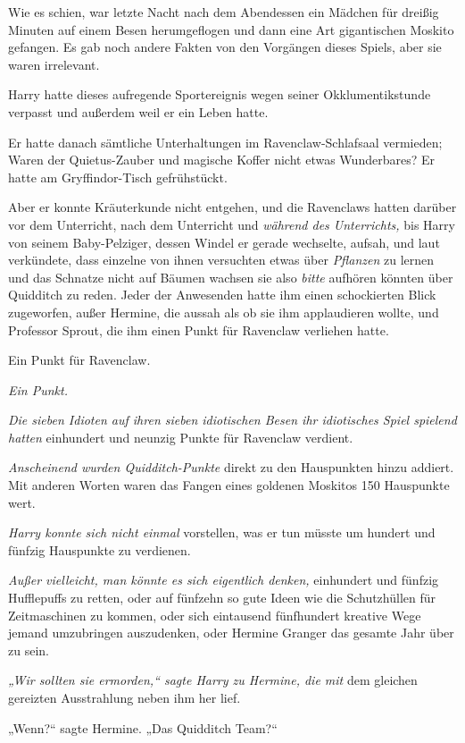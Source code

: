 {Wie es schien, war letzte Nacht nach dem Abendessen ein Mädchen für dreißig Minuten auf einem Besen herumgeflogen und dann eine Art gigantischen Moskito gefangen. Es gab noch andere Fakten von den Vorgängen dieses Spiels, aber sie waren irrelevant.

Harry hatte dieses aufregende Sportereignis wegen seiner Okklumentikstunde verpasst und außerdem weil er ein Leben hatte.

Er hatte danach sämtliche Unterhaltungen im Ravenclaw-Schlafsaal vermieden; Waren der Quietus-Zauber und magische Koffer nicht etwas Wunderbares? Er hatte am Gryffindor-Tisch gefrühstückt.

Aber er konnte Kräuterkunde nicht entgehen, und die Ravenclaws hatten darüber vor dem Unterricht, nach dem Unterricht und \emph{während des Unterrichts,} bis Harry von seinem Baby-Pelziger, dessen Windel er gerade wechselte, aufsah, und laut verkündete, dass einzelne von ihnen versuchten etwas über \emph{Pflanzen} zu lernen und das Schnatze nicht auf Bäumen wachsen sie also \emph{bitte} aufhören könnten über Quidditch zu reden. Jeder der Anwesenden hatte ihm einen schockierten Blick zugeworfen, außer Hermine, die aussah als ob sie ihm applaudieren wollte, und Professor Sprout, die ihm einen Punkt für Ravenclaw verliehen hatte.

Ein Punkt für Ravenclaw.

\emph{Ein Punkt.}

\emph{Die sieben Idioten auf ihren sieben idiotischen Besen ihr idiotisches Spiel spielend hatten} einhundert und neunzig Punkte für Ravenclaw verdient.

\emph{Anscheinend wurden Quidditch-Punkte} direkt zu den Hauspunkten hinzu addiert. Mit anderen Worten waren das Fangen eines goldenen Moskitos 150 Hauspunkte wert.

\emph{Harry konnte sich nicht einmal} vorstellen, was er tun müsste um hundert und fünfzig Hauspunkte zu verdienen.

\emph{Außer vielleicht, man könnte es sich eigentlich denken,} einhundert und fünfzig Hufflepuffs zu retten, oder auf fünfzehn so gute Ideen wie die Schutzhüllen für Zeitmaschinen zu kommen, oder sich eintausend fünfhundert kreative Wege jemand umzubringen auszudenken, oder Hermine Granger das gesamte Jahr über zu sein.

\emph{„Wir sollten sie ermorden,“ sagte Harry zu Hermine, die mit} dem gleichen gereizten Ausstrahlung neben ihm her lief.

„Wenn?“ sagte Hermine. „Das Quidditch Team?“

}
